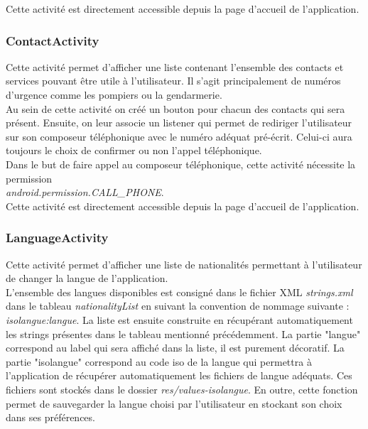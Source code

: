 	Cette activité est directement accessible depuis la page d'accueil de l'application.
		
\subsubsection{ContactActivity}

	Cette activité permet d'afficher une liste contenant l'ensemble des contacts et services pouvant être utile à l'utilisateur. Il s'agit principalement de numéros d'urgence comme les pompiers ou la gendarmerie.
	\\

	Au sein de cette activité on créé un bouton pour chacun des contacts qui sera présent. Ensuite, on leur associe un listener qui permet de rediriger l'utilisateur sur son composeur téléphonique avec le numéro adéquat pré-écrit. Celui-ci aura toujours le choix de confirmer ou non l'appel téléphonique.
	\\
	
	Dans le but de faire appel au composeur téléphonique, cette activité nécessite la permission\\ \emph{android.permission.CALL\_PHONE}. 
	\\
	
	Cette activité est directement accessible depuis la page d'accueil de l'application.

\subsubsection{LanguageActivity}
	
	Cette activité permet d'afficher une liste de nationalités permettant à l'utilisateur de changer la langue de l'application.
	\\
	
	L'ensemble des langues disponibles est consigné dans le fichier XML \emph{strings.xml} dans le tableau \emph{nationalityList} en suivant la convention de nommage suivante : \emph{isolangue:langue}. La liste est ensuite construite en récupérant automatiquement les strings présentes dans le tableau mentionné précédemment. La partie "langue" correspond au label qui sera affiché dans la liste, il est purement décoratif. La partie "isolangue" correspond au code iso de la langue qui permettra à l'application de récupérer automatiquement les fichiers de langue adéquats. Ces fichiers sont stockés dans le dossier \emph{res/values-isolangue}. En outre, cette fonction permet de sauvegarder la langue choisi par l'utilisateur en stockant son choix dans ses préférences.
	\\
	
